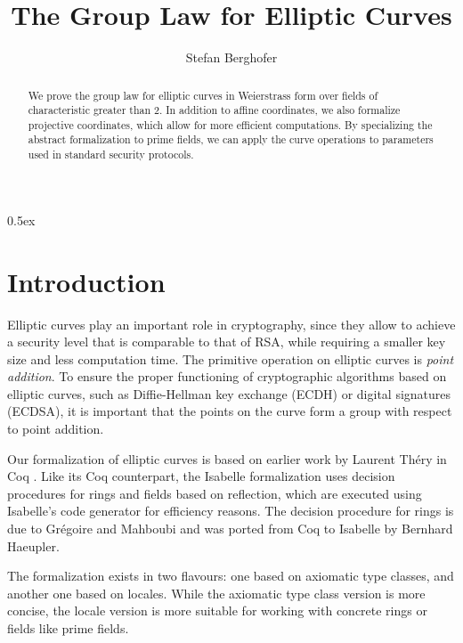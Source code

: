 \documentclass[11pt,a4paper]{article}
\begin{document}
\title{The Group Law for Elliptic Curves}
\author{Stefan Berghofer}
\maketitle

\begin{abstract}
We prove the group law for elliptic curves in Weierstrass form over fields of
characteristic greater than 2. In addition to affine coordinates, we also
formalize projective coordinates, which allow for more efficient computations.
By specializing the abstract formalization to prime fields, we can apply
the curve operations to parameters used in standard security protocols.
\end{abstract}

\tableofcontents

\parindent 0pt\parskip 0.5ex

\section{Introduction}

Elliptic curves play an important role in cryptography, since they allow to achieve
a security level that is comparable to that of RSA, while requiring a smaller key
size and less computation time. The primitive operation on elliptic curves is \emph{point
addition}. To ensure the proper functioning of cryptographic algorithms based on
elliptic curves, such as Diffie-Hellman key exchange (ECDH) or digital signatures
(ECDSA), it is important that the points on the curve form a group with respect
to point addition.

Our formalization of elliptic curves is based on earlier work by Laurent Th{\'e}ry in
Coq \cite{Coq-Elliptic}. Like its Coq counterpart, the Isabelle formalization uses decision
procedures for rings and fields based on reflection, which are executed using Isabelle's
code generator for efficiency reasons. The decision procedure for rings is due to Gr{\'e}goire
and Mahboubi \cite{Mahboubi-Gregoire-TPHOLs2005} and was ported from Coq to Isabelle by
Bernhard Haeupler.

The formalization exists in two flavours: one based on axiomatic type classes, and
another one based on locales. While the axiomatic type class version is more concise,
the locale version is more suitable for working with concrete rings or fields like
prime fields.





\end{document}
